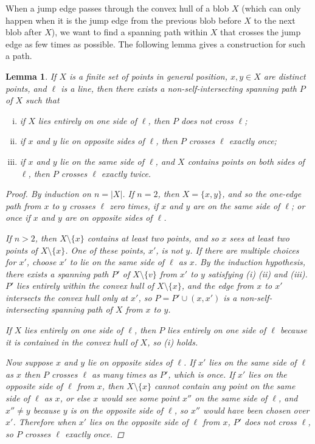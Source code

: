 \documentclass[12pt]{article}
\newtheorem{lemma}{Lemma}
\theoremstyle{definition}
\begin{document}
When a jump edge passes through the convex hull of a blob $X$ (which can only happen when it is the jump edge from the previous blob before $X$ to the next blob after $X$), we want to find a spanning path within $X$ that crosses the jump edge as few times as possible. The following lemma gives a construction for such a path.

\begin{lemma}
  \label{lem:spanning-path-crossing}
  If $X$ is a finite set of points in general position, $x,y\in X$ are distinct points, and $\ell$ is a line, then there exists a non-self-intersecting spanning path $P$ of $X$ such that
  \begin{enumerate}[(i)]
  \item if $X$ lies entirely on one side of $\ell$, then $P$ does not cross $\ell$;
  \item if $x$ and $y$ lie on opposite sides of $\ell$, then $P$ crosses $\ell$ exactly once;
  \item if $x$ and $y$ lie on the same side of $\ell$, and $X$ contains points on both sides of $\ell$, then $P$ crosses $\ell$ exactly twice.
  \end{enumerate}
  
  \begin{proof}
    By induction on $n=|X|$.
    If $n=2$, then $X=\{x,y\}$, and so the one-edge path from $x$ to $y$ crosses $\ell$ zero times, if $x$ and $y$ are on the same side of $\ell$; or once if $x$ and $y$ are on opposite sides of $\ell$.

    If $n>2$, then $X\setminus\{x\}$ contains at least two points, and so $x$ sees at least two points of $X\setminus\{x\}$.
    One of these points, $x'$, is not $y$.
    If there are multiple choices for $x'$, choose $x'$ to lie on the same side of $\ell$ as $x$.
    By the induction hypothesis, there exists a spanning path $P'$ of $X\setminus\{v\}$ from $x'$ to $y$ satisfying (i) (ii) and (iii).
    $P'$ lies entirely within the convex hull of $X\setminus \{x\}$, and the edge from $x$ to $x'$ intersects the convex hull only at $x'$, so $P=P'\cup(x,x')$ is a non-self-intersecting spanning path of $X$ from $x$ to $y$.
    
    If $X$ lies entirely on one side of $\ell$, then $P$ lies entirely on one side of $\ell$ because it is contained in the convex hull of $X$, so (i) holds.

    Now suppose $x$ and $y$ lie on opposite sides of $\ell$.
    If $x'$ lies on the same side of $\ell$ as $x$ then $P$ crosses $\ell$ as many times as $P'$, which is once.
    If $x'$ lies on the opposite side of $\ell$ from $x$, then $X\setminus\{x\}$ cannot contain any point on the same side of $\ell$ as $x$, or else $x$ would see some point $x''$ on the same side of $\ell$, and $x''\neq y$ because $y$ is on the opposite side of $\ell$, so $x''$ would have been chosen over $x'$.
    Therefore when $x'$ lies on the opposite side of $\ell$ from $x$, $P'$ does not cross $\ell$, so $P$ crosses $\ell$ exactly once.
    

\end{proof}
\end{lemma}
\end{document}
